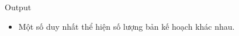 Output
\begin{itemize}
	\item     Một số duy nhất thể hiện số lượng bản kế hoạch khác nhau.   
\end{itemize}